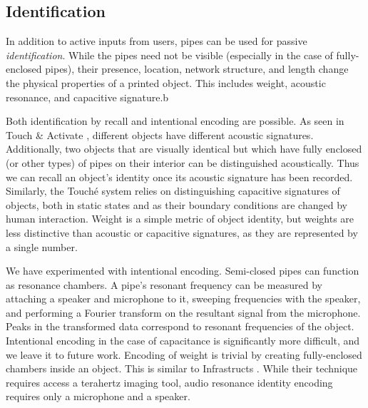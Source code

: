 \subsection{Identification}
In addition to active inputs from users, pipes can be used for passive \emph{identification}.  While the pipes need not be visible (especially in the case of fully-enclosed pipes), their presence, location, network structure, and length change the physical properties of a printed object.  This includes weight, acoustic resonance, and capacitive signature.b

Both identification by recall and intentional encoding are possible.  As seen in Touch \& Activate \cite{Ono-touchandactivate}, different objects have different acoustic signatures.  Additionally, two objects that are visually identical but which have fully enclosed (or other types) of pipes on their interior can be distinguished acoustically.  Thus we can recall an object's identity once its acoustic signature has been recorded.  Similarly, the Touch\'{e} system \cite{Sato-touche} relies on distinguishing capacitive signatures of objects, both in static states and as their boundary conditions are changed by human interaction.  Weight is a simple metric of object identity, but weights are less distinctive than acoustic or capacitive signatures, as they are represented by a single number. 

We have experimented with intentional encoding.  Semi-closed pipes can function as resonance chambers.  A pipe's resonant frequency can be measured by attaching a speaker and microphone to it, sweeping frequencies with the speaker, and performing a Fourier transform on the resultant signal from the microphone.  Peaks in the transformed data correspond to resonant frequencies of the object.  Intentional encoding in the case of capacitance is significantly more difficult, and we leave it to future work.  Encoding of weight is trivial by creating fully-enclosed chambers inside an object.  This is similar to Infrastructs \cite{Willis-infrastructs}.  While their technique requires access a terahertz imaging tool, audio resonance identity encoding requires only a microphone and a speaker.


